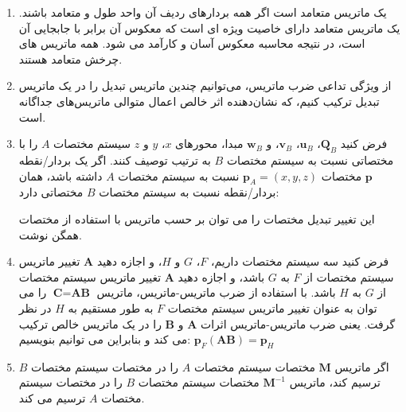 {\begin{spacing}{1.5}
\begin{enumerate}[label=\textbf{\arabic*}.]
            \item {یک ماتریس متعامد است اگر همه بردارهای ردیف آن واحد طول و متعامد باشند.
            یک ماتریس متعامد دارای خاصیت ویژه ای است که معکوس آن برابر با جابجایی آن است،
            در نتیجه محاسبه معکوس آسان و کارآمد می شود. همه ماتریس های چرخش متعامد هستند.}

            \item {از ویژگی تداعی ضرب ماتریس، می‌توانیم چندین ماتریس تبدیل را در یک ماتریس تبدیل ترکیب کنیم، که نشان‌دهنده اثر خالص اعمال متوالی ماتریس‌های جداگانه است.}

            \item {فرض کنید $\textbf{Q}_{B}$، $\textbf{u}_{B}$، $\textbf{v}_{B}$، و $\textbf{w}_{B}$ مبدا، محورهای $x$، $y$ و $z$ سیستم مختصات $A$ را با مختصاتی نسبت به سیستم مختصات $B$ به ترتیب توصیف کنند.
            اگر یک بردار/نقطه $\textbf{p}$ مختصات $\textbf{p}_{A}=(x,y,z)$ نسبت به سیستم مختصات $A$ داشته باشد، همان بردار/نقطه نسبت به سیستم مختصات $B$ مختصاتی دارد:
                \begin{flushleft}
                \end{flushleft}
                این تغییر تبدیل مختصات را می توان بر حسب ماتریس با استفاده از مختصات همگن نوشت.
            }

            \item {فرض کنید سه سیستم مختصات داریم، $F$، $G$ و $H$، و اجازه دهید $\textbf{A}$ تغییر ماتریس سیستم مختصات از $F$ به $G$ باشد، و اجازه دهید $\textbf{A}$ تغییر ماتریس سیستم مختصات از $G$ به $H$ باشد.
            با استفاده از ضرب ماتریس-ماتریس، ماتریس $\textbf{C}=\textbf{AB}$ را می توان به عنوان تغییر ماتریس سیستم مختصات $F$ به طور مستقیم به $H$ در نظر گرفت.
            یعنی ضرب ماتریس-ماتریس اثرات $\textbf{A}$ و $\textbf{B}$ را در یک ماتریس خالص ترکیب می کند و بنابراین می توانیم بنویسیم:
                $\textbf{p}_{F}(\textbf{AB})=\textbf{p}_{H}$}

            \item {اگر ماتریس $\textbf{M}$ مختصات سیستم مختصات $A$ را در مختصات سیستم مختصات $B$ ترسیم کند،
            ماتریس $\textbf{M}^{-1}$ مختصات سیستم مختصات $B$ را در مختصات سیستم مختصات $A$ ترسیم می کند.}


\end{enumerate}
\end{spacing}}
